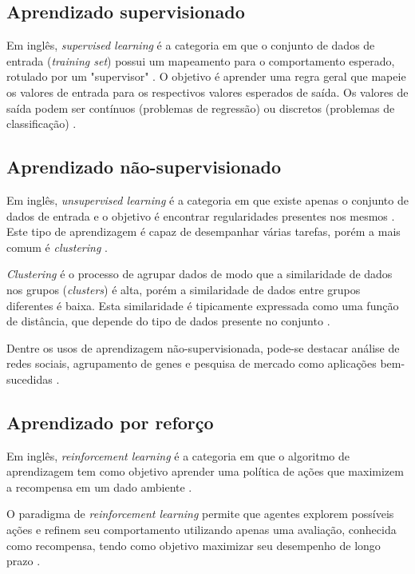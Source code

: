 \subsection{Aprendizado supervisionado}

Em inglês, \textit{supervised learning} é a categoria em que o conjunto de dados de entrada (\textit{training set}) possui um mapeamento para o comportamento esperado, rotulado por um "supervisor" \cite{alpaydin2020introduction}. O objetivo é aprender uma regra geral que mapeie os valores de entrada para os respectivos valores esperados de saída. Os valores de saída podem ser contínuos (problemas de regressão) ou discretos (problemas de classificação) \cite{8527529}.

\subsection{Aprendizado não-supervisionado}

Em inglês, \textit{unsupervised learning} é a categoria em que existe apenas o conjunto de dados de entrada e o objetivo é encontrar regularidades presentes nos mesmos \cite{alpaydin2020introduction}. Este tipo de aprendizagem é capaz de desempanhar várias tarefas, porém a mais comum é \textit{clustering} \cite{8527529}.

\textit{Clustering} é o processo de agrupar dados de modo que a similaridade de dados nos grupos (\textit{clusters}) é alta, porém a similaridade de dados entre grupos diferentes é baixa. Esta similaridade é tipicamente expressada como uma função de distância, que depende do tipo de dados presente no conjunto \cite{8527529}.

Dentre os usos de aprendizagem não-supervisionada, pode-se destacar análise de redes sociais, agrupamento de genes e pesquisa de mercado como aplicações bem-sucedidas \cite{8527529}.

\subsection{Aprendizado por reforço}

Em inglês, \textit{reinforcement learning} é a categoria em que o algoritmo de aprendizagem tem como objetivo aprender uma política de ações que maximizem a recompensa em um dado ambiente \cite{alpaydin2020introduction}.

O paradigma de \textit{reinforcement learning} permite que agentes explorem possíveis ações e refinem seu comportamento utilizando apenas uma avaliação, conhecida como recompensa, tendo como objetivo maximizar seu desempenho de longo prazo \cite{8527529}.

